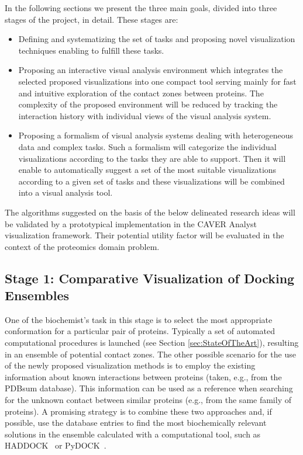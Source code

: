 \documentclass[11pt,a4paper,titlepage,oneside,onecolumn]{article}
\begin{document}
In the following sections we present the three main goals, divided into three stages of the project, in detail. These stages are:
\begin{itemize}
\item Defining and systematizing the set of tasks and proposing novel visualization techniques enabling to fulfill these tasks. 
\item Proposing an interactive visual analysis environment which integrates the selected proposed visualizations into one compact tool serving mainly for fast and intuitive exploration of the contact zones between proteins. The complexity of the proposed environment will be reduced by tracking the interaction history with individual views of the visual analysis system.
\item Proposing a formalism of visual analysis systems dealing with heterogeneous data and complex tasks. Such a formalism will categorize the individual visualizations according to the tasks they are able to support. Then it will enable to automatically suggest a set of the most suitable visualizations according to a given set of tasks and these visualizations will be combined into a visual analysis tool.
\end{itemize}

The algorithms suggested on the basis of the below delineated research ideas will be validated by a prototypical implementation in the CAVER Analyst visualization framework. 
Their potential utility factor will be evaluated in the context of the proteomics domain problem. 


\subsection{Stage 1: Comparative Visualization of Docking Ensembles}
One of the biochemist's task in this stage is to select the most appropriate conformation for a particular pair of proteins.
Typically a set of automated computational procedures is launched (see Section \ref{sec:StateOfTheArt}), resulting in an ensemble of potential contact zones.
The other possible scenario for the use of the newly proposed visualization methods is to employ the existing information about known interactions between proteins (taken, e.g., from the PDBsum database).
This information can be used as a reference when searching for the unknown contact between similar proteins (e.g., from the same family of proteins). 
A promising strategy is to combine these two approaches and, if possible, use the database entries to find the most biochemically relevant solutions in the ensemble calculated with a computational tool, such as HADDOCK~\cite{haddock} or PyDOCK~\cite{pydock}.
\end{document}
